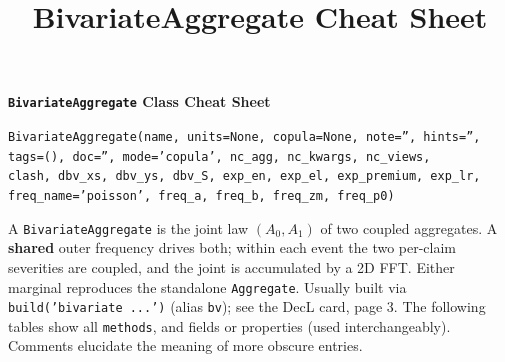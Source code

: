 %
%
%


\title{BivariateAggregate Cheat Sheet}





{\huge{\textbf{\texttt{BivariateAggregate} Class Cheat Sheet}}}

\raggedright
\texttt{\m BivariateAggregate(name, units=None, copula=None, note='', hints='', tags=(), doc='', mode='copula', nc\_agg, nc\_kwargs, nc\_views,} \\
\texttt{\phantom{\m}clash, dbv\_xs, dbv\_ys, dbv\_S, exp\_en, exp\_el, exp\_premium, exp\_lr, freq\_name='poisson', freq\_a, freq\_b, freq\_zm, freq\_p0)}

A \texttt{BivariateAggregate} is the joint law $(A_0, A_1)$ of two coupled aggregates. A \textbf{shared} outer frequency drives both; within each event the two per-claim severities are coupled, and the joint is accumulated by a 2D FFT. Either marginal reproduces the standalone \texttt{Aggregate}. Usually built via \texttt{build('bivariate ...')} (alias \texttt{bv}); see the DecL card, page 3.
The following tables show all \texttt{\m methods}, and fields or properties (used interchangeably). Comments elucidate the meaning of more obscure entries.


